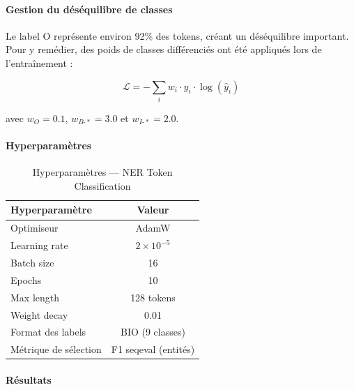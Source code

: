 \paragraph{Gestion du déséquilibre de classes}

Le label O représente environ 92\% des tokens, créant un déséquilibre important. Pour y remédier, des poids de classes différenciés ont été appliqués lors de l'entraînement :

\begin{equation}
\mathcal{L} = -\sum_{i} w_i \cdot y_i \cdot \log(\hat{y}_i)
\end{equation}

avec $w_O = 0.1$, $w_{B\text{-}*} = 3.0$ et $w_{I\text{-}*} = 2.0$.

\paragraph{Hyperparamètres}

\begin{table}[H]
\centering
\caption{Hyperparamètres — NER Token Classification}
\label{tab:ner-hp}
\renewcommand{\arraystretch}{1.4}
\begin{tabular}{|l|c|}
\hline
\textbf{Hyperparamètre} & \textbf{Valeur} \\
\hline
Optimiseur            & AdamW \\
Learning rate         & $2 \times 10^{-5}$ \\
Batch size            & 16 \\
Epochs                & 10 \\
Max length            & 128 tokens \\
Weight decay          & 0.01 \\
Format des labels     & BIO (9 classes) \\
Métrique de sélection & F1 seqeval (entités) \\
\hline
\end{tabular}
\end{table}

\paragraph{Résultats}

